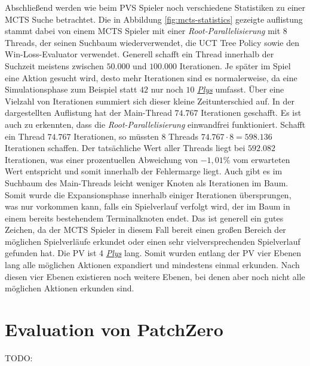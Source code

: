 Abschließend werden wie beim \ac{PVS} Spieler noch verschiedene Statistiken zu einer \ac{MCTS} Suche betrachtet. Die in Abbildung \ref{fig:mcts-statistics} gezeigte auflistung stammt dabei von einem \ac{MCTS} Spieler mit einer \emph{Root-Parallelisierung} mit 8 Threads, der seinen Suchbaum wiederverwendet, die \ac{UCT} Tree Policy sowie den Win-Loss-Evaluator verwendet. Generell schafft ein Thread innerhalb der Suchzeit meistens zwischen $50{.}000$ und $100{.}000$ Iterationen. Je später im Spiel eine Aktion gesucht wird, desto mehr Iterationen sind es normalerweise, da eine Simulationsphase zum Beispiel statt $42$ nur noch $10$ \hyperref[text:ply]{\emph{Plys}} umfasst. Über eine Vielzahl von Iterationen summiert sich dieser kleine Zeitunterschied auf. In der dargestellten Auflistung hat der Main-Thread $74{.}767$ Iterationen geschafft. Es ist auch zu erkennten, dass die \emph{Root-Parallelisierung} einwandfrei funktioniert. Schafft ein Thread $74{.}767$ Iterationen, so müssten 8 Threads $74{.}767 \cdot 8 = 598{.}136$ Iterationen schaffen. Der tatsächliche Wert aller Threads liegt bei $592{.}082$ Iterationen, was einer prozentuellen Abweichung von $-1{,}01\%$ vom erwarteten Wert entspricht und somit innerhalb der Fehlermarge liegt. Auch gibt es im Suchbaum des Main-Threads leicht weniger Knoten als Iterationen im Baum. Somit wurde die Expansionsphase innerhalb einiger Iterationen übersprungen, was nur vorkommen kann, falls ein Spielverlauf verfolgt wird, der im Baum in einem bereits bestehendem Terminalknoten endet. Das ist generell ein gutes Zeichen, da der \ac{MCTS} Spieler in diesem Fall bereit einen großen Bereich der möglichen Spielverläufe erkundet oder einen sehr vielversprechenden Spielverlauf gefunden hat. Die \acl{PV} ist 4 \hyperref[text:ply]{\emph{Plys}} lang. Somit wurden entlang der \ac{PV} vier Ebenen lang alle möglichen Aktionen expandiert und mindestens einmal erkunden. Nach diesen vier Ebenen existieren noch weitere Ebenen, bei denen aber noch nicht alle möglichen Aktionen erkunden sind.

\section{Evaluation von PatchZero}

TODO:

